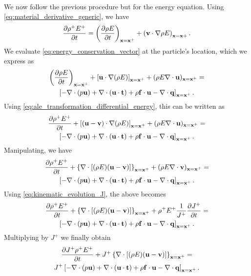 \documentclass[oneside,a4paper,11pt]{report}
\begin{document}
We now follow the previous procedure but for the energy equation. Using \cref{eq:material_derivative_generic}, we have
\begin{equation}
\label{eq:ale_transformation_differential_energy}
    \frac{\partial \rho^+ E^+}{\partial t} = \left ( \frac{\partial \rho E}{\partial t} \right )_{\mathbf{x} = \mathbf{x}^+} + \left(\mathbf{v} \cdot \nabla \rho E \right)_{\mathbf{x} = \mathbf{x} +}.
\end{equation}
We evaluate \cref{eq:energy_conservation_vector} at the particle's location, which we express as
\begin{multline*}
\left ( \frac{\partial \rho E}{\partial t} \right )_{\mathbf{x} = \mathbf{x}^+} + \left [ \mathbf{u} \cdot \nabla (\rho E) \right]_{\mathbf{x} = \mathbf{x}^+} + (\rho E \nabla \cdot \mathbf{u})_{\mathbf{x} = \mathbf{x}^+} = \\
\left [ -\nabla \cdot (p \mathbf{u}) + \nabla \cdot (\mathbf{u} \cdot \mathbf{t}) + \rho \mathbf{f} \cdot \mathbf{u} - \nabla \cdot \mathbf{q} \right ]_{\mathbf{x} = \mathbf{x}^+}.
\end{multline*}
Using \cref{eq:ale_transformation_differential_energy}, this can be written as
\begin{multline*}
\frac{\partial \rho^+ E^+}{\partial t} + \left [ (\mathbf{u} - \mathbf{v}) \cdot \nabla (\rho E) \right]_{\mathbf{x} = \mathbf{x}^+} + (\rho E \nabla \cdot \mathbf{u})_{\mathbf{x} = \mathbf{x}^+} = \\
\left [ -\nabla \cdot (p \mathbf{u}) + \nabla \cdot (\mathbf{u} \cdot \mathbf{t}) + \rho \mathbf{f} \cdot \mathbf{u} - \nabla \cdot \mathbf{q} \right ]_{\mathbf{x} = \mathbf{x}^+}.
\end{multline*}
Manipulating, we have
\begin{multline*}
\frac{\partial \rho^+ E^+}{\partial t} + \left \{ \nabla \cdot [ (\rho E) (\mathbf{u} - \mathbf{v}) ] \right \}_{\mathbf{x} = \mathbf{x}^+} + (\rho E \nabla \cdot \mathbf{v})_{\mathbf{x} = \mathbf{x}^+} = \\
\left [ -\nabla \cdot (p \mathbf{u}) + \nabla \cdot (\mathbf{u} \cdot \mathbf{t}) + \rho \mathbf{f} \cdot \mathbf{u} - \nabla \cdot \mathbf{q} \right ]_{\mathbf{x} = \mathbf{x}^+}.
\end{multline*}
Using \cref{eq:kinematic_evolution_J}, the above becomes
\begin{multline*}
\frac{\partial \rho^+ E^+}{\partial t} + \left \{ \nabla \cdot [ (\rho E) (\mathbf{u} - \mathbf{v}) ] \right \}_{\mathbf{x} = \mathbf{x}^+} + \rho^+ E^+ \frac{1}{J^+} \frac{\partial J^+}{\partial t} = \\
\left [ -\nabla \cdot (p \mathbf{u}) + \nabla \cdot (\mathbf{u} \cdot \mathbf{t}) + \rho \mathbf{f} \cdot \mathbf{u} - \nabla \cdot \mathbf{q} \right ]_{\mathbf{x} = \mathbf{x}^+}.
\end{multline*}
Multiplying by $J^+$ we finally obtain
\begin{multline}
    \label{eq:ale_differential_energy_conservation}
\frac{\partial J^+ \rho^+ E^+}{\partial t} + J^+ \left \{ \nabla \cdot [ (\rho E) (\mathbf{u} - \mathbf{v}) ] \right \}_{\mathbf{x} = \mathbf{x}^+} = \\
J^+ \left [ -\nabla \cdot (p \mathbf{u}) + \nabla \cdot (\mathbf{u} \cdot \mathbf{t}) + \rho \mathbf{f} \cdot \mathbf{u} - \nabla \cdot \mathbf{q} \right ]_{\mathbf{x} = \mathbf{x}^+}.
\end{multline}
\end{document}

